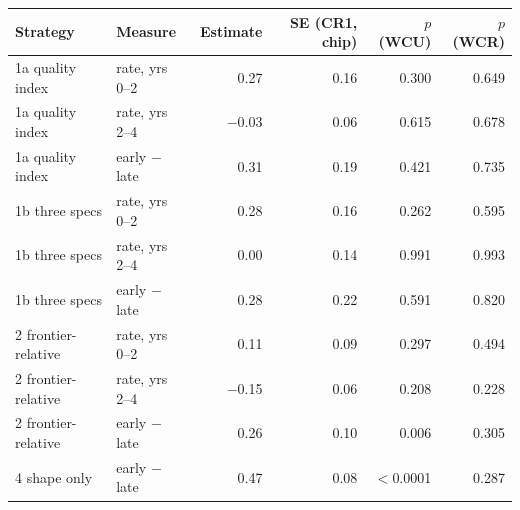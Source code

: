 \begin{tabular}{llrrrr}
\hline
Strategy & Measure & Estimate & SE (CR1, chip) & $p$ (WCU) & $p$ (WCR) \\
\hline
1a quality index & rate, yrs 0--2 & 0.27 & 0.16 & 0.300 & 0.649 \\
1a quality index & rate, yrs 2--4 & $-$0.03 & 0.06 & 0.615 & 0.678 \\
1a quality index & early $-$ late & 0.31 & 0.19 & 0.421 & 0.735 \\
1b three specs & rate, yrs 0--2 & 0.28 & 0.16 & 0.262 & 0.595 \\
1b three specs & rate, yrs 2--4 & 0.00 & 0.14 & 0.991 & 0.993 \\
1b three specs & early $-$ late & 0.28 & 0.22 & 0.591 & 0.820 \\
2 frontier-relative & rate, yrs 0--2 & 0.11 & 0.09 & 0.297 & 0.494 \\
2 frontier-relative & rate, yrs 2--4 & $-$0.15 & 0.06 & 0.208 & 0.228 \\
2 frontier-relative & early $-$ late & 0.26 & 0.10 & 0.006 & 0.305 \\
4 shape only & early $-$ late & 0.47 & 0.08 & $<$0.0001 & 0.287 \\
\hline
\end{tabular}

